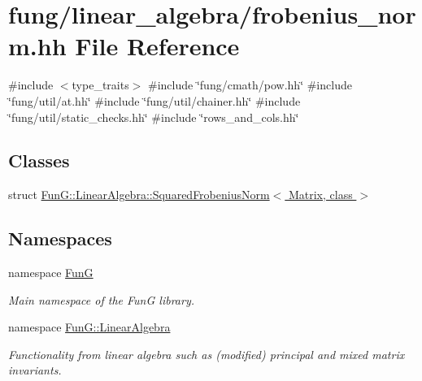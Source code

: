 \hypertarget{frobenius__norm_8hh}{\section{fung/linear\-\_\-algebra/frobenius\-\_\-norm.hh \-File \-Reference}
\label{frobenius__norm_8hh}
}
{\ttfamily \#include $<$type\-\_\-traits$>$}\*
{\ttfamily \#include \char`\"{}fung/cmath/pow.\-hh\char`\"{}}\*
{\ttfamily \#include \char`\"{}fung/util/at.\-hh\char`\"{}}\*
{\ttfamily \#include \char`\"{}fung/util/chainer.\-hh\char`\"{}}\*
{\ttfamily \#include \char`\"{}fung/util/static\-\_\-checks.\-hh\char`\"{}}\*
{\ttfamily \#include \char`\"{}rows\-\_\-and\-\_\-cols.\-hh\char`\"{}}\*
\subsection*{\-Classes}
\begin{DoxyCompactItemize}
\item 
struct \hyperlink{structFunG_1_1LinearAlgebra_1_1SquaredFrobeniusNorm}{\-Fun\-G\-::\-Linear\-Algebra\-::\-Squared\-Frobenius\-Norm$<$ Matrix, class $>$}
\end{DoxyCompactItemize}
\subsection*{\-Namespaces}
\begin{DoxyCompactItemize}
\item 
namespace \hyperlink{namespaceFunG}{\-Fun\-G}
\begin{DoxyCompactList}\small\item\em \-Main namespace of the \-Fun\-G library. \end{DoxyCompactList}\item 
namespace \hyperlink{namespaceFunG_1_1LinearAlgebra}{\-Fun\-G\-::\-Linear\-Algebra}
\begin{DoxyCompactList}\small\item\em \-Functionality from linear algebra such as (modified) principal and mixed matrix invariants. \end{DoxyCompactList}\end{DoxyCompactItemize}
